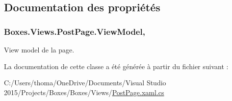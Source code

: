 \subsection{Documentation des propriétés}
\subsubsection[{\texorpdfstring{View\+Model}{ViewModel}}]{ Boxes.\+Views.\+Post\+Page.\+View\+Model\hspace{0.3cm}{\ttfamily [get]}, {\ttfamily [private]}}\hypertarget{class_boxes_1_1_views_1_1_post_page_a394882bb881242344c623ed300e73ee4}{}\label{class_boxes_1_1_views_1_1_post_page_a394882bb881242344c623ed300e73ee4}


View model de la page. 



La documentation de cette classe a été générée à partir du fichier suivant \+:\begin{DoxyCompactItemize}
\item 
C\+:/\+Users/thoma/\+One\+Drive/\+Documents/\+Visual Studio 2015/\+Projects/\+Boxes/\+Boxes/\+Views/\hyperlink{_post_page_8xaml_8cs}{Post\+Page.\+xaml.\+cs}\end{DoxyCompactItemize}
